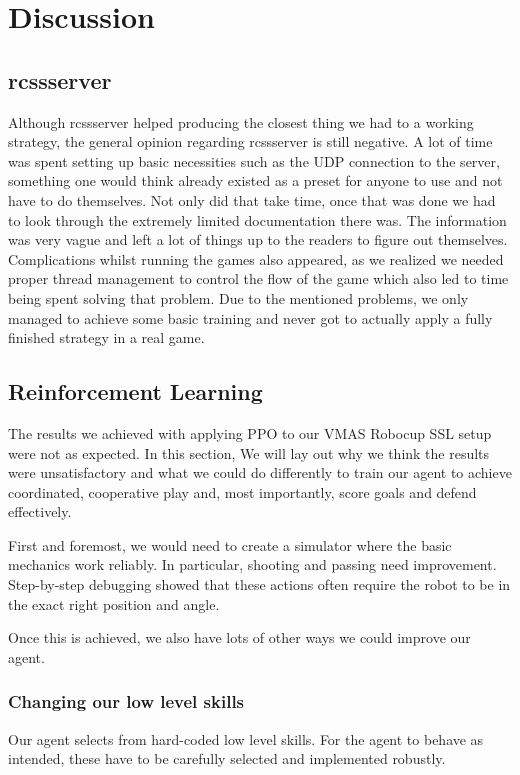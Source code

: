 \section{Discussion}
\label{section:disc}

\subsection{rcssserver}
Although rcssserver helped producing the closest thing we had to a working strategy, the general opinion regarding rcssserver is still negative. A lot of time was spent setting up basic necessities such as the UDP connection to the server, something one would think already existed as a preset for anyone to use and not have to do themselves. Not only did that take time, once that was done we had to look through the extremely limited documentation there was. The information was very vague and left a lot of things up to the readers to figure out themselves. Complications whilst running the games also appeared, as we realized we needed proper thread management to control the flow of the game which also led to time being spent solving that problem. Due to the mentioned problems, we only managed to achieve some basic training and never got to actually apply a fully finished strategy in a real game.

\subsection{Reinforcement Learning}
The results we achieved with applying PPO to our VMAS Robocup SSL setup were not as expected.
In this section, We will lay out why we think the results were unsatisfactory and what we could do differently to train our agent to achieve coordinated, cooperative play and, most importantly, score goals and defend effectively.

First and foremost, we would need to create a simulator where the basic mechanics work reliably. In particular, shooting and passing need improvement. Step-by-step debugging showed that these actions often require the robot to be in the exact right position and angle.

Once this is achieved, we also have lots of other ways we could improve our agent.

\subsubsection{Changing our low level skills}
Our agent selects from hard-coded low level skills. For the agent to behave as intended, these have to be carefully selected and implemented robustly.

